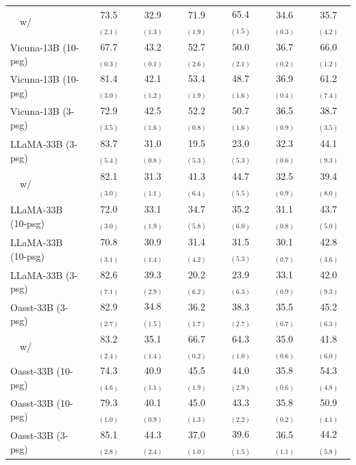 \documentclass[11pt]{article}
\newcommand{\vani}{{\sc{Vanilla}}}
\newcommand{\summ}{{\sc{Summ}}}
\newcommand{\snippet}{{\sc{Snippet}}}
\newcommand{\rerank}{{\sc{Rerank}}}
\newcommand{\oracle}{{\sc{Oracle}}}
\begin{document}
\begin{table}[h]
\begin{tabular}{lcccccc}
            ~~w/ \rerank & 73.5 $_{(2.1)}$ & 32.9 $_{(1.3)}$ & 71.9 $_{(1.9)}$ & 65.4 $_{(1.5)}$ & 34.6 $_{(0.3)}$ & 35.7 $_{(4.2)}$ \\
            Vicuna-13B \summ{} (10-psg) & 67.7 $_{(0.3)}$ & 43.2 $_{(0.1)}$ & 52.7 $_{(2.6)}$ & 50.0 $_{(2.1)}$ & 36.7 $_{(0.2)}$ & 66.0 $_{(1.2)}$ \\
            Vicuna-13B \snippet{} (10-psg) & 81.4 $_{(3.0)}$ & 42.1 $_{(1.2)}$ & 53.4 $_{(1.9)}$ & 48.7 $_{(1.6)}$ & 36.9 $_{(0.4)}$ & 61.2 $_{(7.4)}$ \\
            Vicuna-13B \oracle{} (3-psg) & 72.9 $_{(3.5)}$ & 42.5 $_{(1.6)}$ & 52.2 $_{(0.8)}$ & 50.7 $_{(1.6)}$ & 36.5 $_{(0.9)}$ & 38.7 $_{(3.5)}$ \\ \midrule
            LLaMA-33B \vani{} (3-psg) & 83.7 $_{(5.4)}$ & 31.0 $_{(0.8)}$ & 19.5 $_{(5.3)}$ & 23.0 $_{(5.3)}$ & 32.3 $_{(0.6)}$ & 44.1 $_{(9.3)}$ \\
            ~~w/ \rerank & 82.1 $_{(3.0)}$ & 31.3 $_{(1.1)}$ & 41.3 $_{(6.4)}$ & 44.7 $_{(5.5)}$ & 32.5 $_{(0.9)}$ & 39.4 $_{(8.0)}$ \\
            LLaMA-33B \summ{} (10-psg) & 72.0 $_{(3.0)}$ & 33.1 $_{(1.9)}$ & 34.7 $_{(5.8)}$ & 35.2 $_{(6.0)}$ & 31.1 $_{(0.8)}$ & 43.7 $_{(5.0)}$ \\
            LLaMA-33B \snippet{} (10-psg) & 70.8 $_{(3.1)}$ & 30.9 $_{(1.4)}$ & 31.4 $_{(4.2)}$ & 31.5 $_{(5.3)}$ & 30.1 $_{(0.7)}$ & 42.8 $_{(3.6)}$ \\
            LLaMA-33B \oracle{} (3-psg) & 82.6 $_{(7.1)}$ & 39.3 $_{(2.9)}$ & 20.2 $_{(6.2)}$ & 23.9 $_{(6.3)}$ & 33.1 $_{(0.9)}$ & 42.0 $_{(9.3)}$ \\ \midrule
            Oasst-33B \vani{} (3-psg) & 82.9 $_{(2.7)}$ & 34.8 $_{(1.5)}$ & 36.2 $_{(1.7)}$ & 38.3 $_{(2.7)}$ & 35.5 $_{(0.7)}$ & 45.2 $_{(6.3)}$ \\
            ~~w/ \rerank & 83.2 $_{(2.4)}$ & 35.1 $_{(1.4)}$ & 66.7 $_{(0.2)}$ & 64.3 $_{(1.0)}$ & 35.0 $_{(0.6)}$ & 41.8 $_{(6.0)}$ \\
            Oasst-33B \summ{} (10-psg) & 74.3 $_{(4.6)}$ & 40.9 $_{(1.1)}$ & 45.5 $_{(1.9)}$ & 44.0 $_{(2.9)}$ & 35.8 $_{(0.6)}$ & 54.3 $_{(4.8)}$ \\
            Oasst-33B \snippet{} (10-psg) & 79.3 $_{(1.0)}$ & 40.1 $_{(0.9)}$ & 45.0 $_{(1.3)}$ & 43.3 $_{(2.2)}$ & 35.8 $_{(0.2)}$ & 50.9 $_{(4.1)}$ \\
            Oasst-33B \oracle{} (3-psg) & 85.1 $_{(2.8)}$ & 44.3 $_{(2.4)}$ & 37.0 $_{(1.0)}$ & 39.6 $_{(1.5)}$ & 36.5 $_{(1.1)}$ & 44.2 $_{(5.8)}$ \\ 

\end{tabular}
\end{table}
\end{document}
